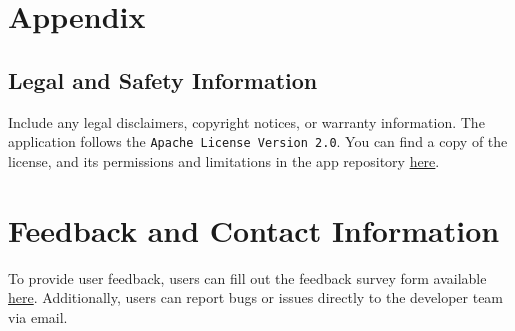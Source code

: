 \documentclass[12pt, titlepage]{article}
\begin{document}

\newpage
\section{Appendix}

\subsection{Legal and Safety Information}
Include any legal disclaimers, copyright notices, or warranty information.
The application follows the \texttt{Apache License Version 2.0}. You can find a copy of the license, and its permissions and limitations in the app repository \href{https://github.com/russellrd/realm/blob/main/LICENSE}{here}.

\section{Feedback and Contact Information}

To provide user feedback, users can fill out the feedback survey form available \href{https://docs.google.com/forms/d/1vMPKYSl9AzGX9eO3fxNMUmQk0IhUB8fbnOACOne6x5Y/edit}{here}. Additionally, users can report bugs or issues directly to the developer team via email.
\end{document}
